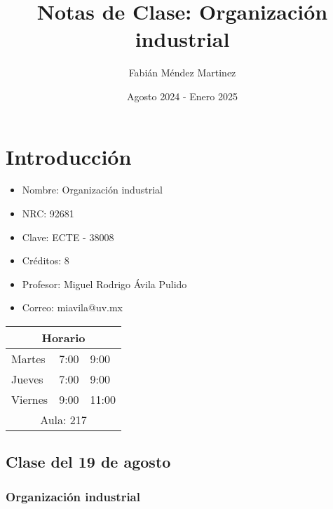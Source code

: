 \documentclass[letterpaper,12pt,twocolumn]{report}
\title{Notas de Clase: Organización industrial}
\author{Fabián Méndez Martinez}
\date{Agosto 2024 - Enero 2025}
\begin{document}
\maketitle
\tableofcontents


\chapter{Introducción}


\begin{tcolorbox}[title=\large Información de la EE]
    \begin{itemize}
        \item Nombre: Organización industrial
        \item NRC: 92681
        \item Clave: ECTE - 38008
        \item Créditos: 8
    \end{itemize}
\end{tcolorbox}

\begin{tcolorbox}[title=\large Información del Profesor]
    \begin{itemize}
        \item Profesor: Miguel Rodrigo Ávila
Pulido
        \item Correo: miavila@uv.mx
    \end{itemize}
\end{tcolorbox}

\begin{table}[h]
\centering
\begin{tabular}{l|ll}
\multicolumn{3}{c}{\textbf{Horario}}      \\ 
\hline
Martes     & 7:00 & 9:00          \\ 
\hline
Jueves & 7:00 & 9:00          \\ 
\hline
Viernes   & 9:00 & 11:00          \\ 
\hline
\multicolumn{3}{c}{Aula: 217}   
\end{tabular}
\end{table}
\pagebreak

\section{Clase del 19 de agosto}

\subsection*{Organización industrial}
\end{document}
